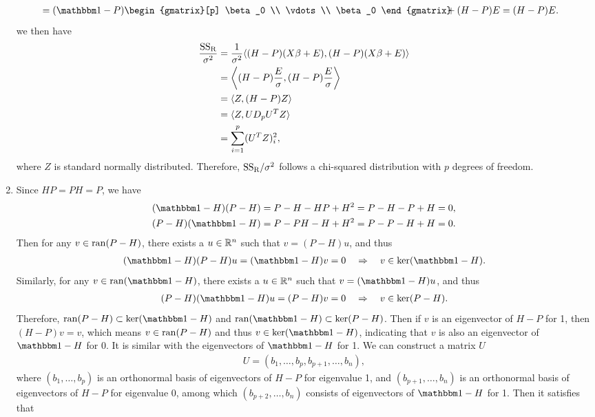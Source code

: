 \begin{enumerate}
\begin{align*}
	& = (\bbone - P)\begin{gmatrix}[p]
	\beta_0  \\
	\vdots  \\
	\beta_0 
	\end{gmatrix}\!\!\!\! + (H-P)E = (H-P)E.
	\end{align*}
	we then have
	\begin{align*}
	\frac{\mathrm{SS_R}}{\sigma^2} & = \frac{1}{\sigma^2}\langle (H-P)(X\beta + E), (H-P)(X\beta + E)\rangle \\
	& =  \left\langle (H-P)\frac{E}{\sigma}, (H-P)\frac{E}{\sigma}\right\rangle \\
	& = \langle Z, (H-P)Z\rangle \\
	& = \langle Z, UD_pU^T Z\rangle  \\
	& = \sum_{i=1}^{p} (U^TZ)_i^2,
	\end{align*}
	where $Z$ is standard normally distributed. Therefore, $\mathrm{SS_R}/\sigma^2$ follows a chi-squared distribution with $p$ degrees of freedom.
	\item Since $HP = PH = P$, we have
	\begin{align*}
	(\bbone - H)(P - H) & = P - H - HP + H^2 = P - H - P + H = 0, \\
	(P - H)(\bbone - H) & = P - PH - H + H^2 = P - P - H + H = 0.
	\end{align*}
	Then for any $v\in \mathrm{ran}(P - H)$, there exists a $u\in \mathbb{R}^n$ such that $v = (P-H)u$, and thus
	\begin{align*}
	(\bbone - H)(P - H)u = (\bbone - H)v = 0\quad\Rightarrow\quad v\in \U{ker}(\bbone - H).
	\end{align*}
	Similarly, for any $v\in \U{ran}(\bbone - H)$, there exists a $u\in \mathbb{R}^n$ such that $v = (\bbone - H)u$, and thus
	\begin{align*}
	(P - H)(\bbone - H)u = (P - H)v = 0\quad\Rightarrow\quad v\in \U{ker}(P - H).
	\end{align*}
	Therefore, $\U{ran}(P - H)\subset\U{ker}(\bbone - H)$ and $\U{ran}(\bbone - H)\subset \U{ker}(P - H)$. Then if $v$ is an eigenvector of $H-P$ for 1, then $(H-P)v = v$, which means $v\in \mathrm{ran}(P-H)$ and thus $v\in \U{ker}(\bbone-H)$, indicating that $v$ is also an eigenvector of $\bbone-H$ for 0. It is similar with the eigenvectors of $\bbone-H$ for 1. We can construct a matrix $U$ 
	\begin{align*}
	U = (b_1, \ldots, b_p, b_{p+1}, \ldots, b_n),
	\end{align*}
	where $(b_1, \ldots, b_p)$ is an orthonormal basis of eigenvectors of $H-P$ for eigenvalue 1, and $(b_{p+1}, \ldots, b_n)$ is an orthonormal basis of eigenvectors of $H-P$ for eigenvalue 0, among which $(b_{p+2}, \ldots, b_{n})$ consists of eigenvectors of $\bbone-H$ for 1. Then it satisfies that

\end{enumerate}
